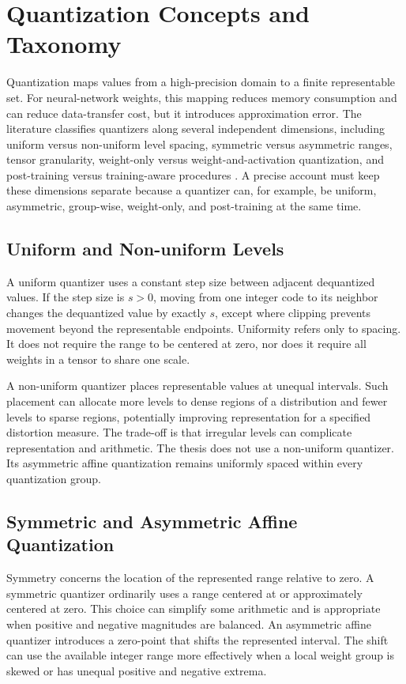 \section{Quantization Concepts and Taxonomy}

Quantization maps values from a high-precision domain to a finite representable set. For neural-network weights, this mapping reduces memory consumption and can reduce data-transfer cost, but it introduces approximation error. The literature classifies quantizers along several independent dimensions, including uniform versus non-uniform level spacing, symmetric versus asymmetric ranges, tensor granularity, weight-only versus weight-and-activation quantization, and post-training versus training-aware procedures \cite{gholami2021survey,nagel2021white}. A precise account must keep these dimensions separate because a quantizer can, for example, be uniform, asymmetric, group-wise, weight-only, and post-training at the same time.

\subsection{Uniform and Non-uniform Levels}

A uniform quantizer uses a constant step size between adjacent dequantized values. If the step size is $s>0$, moving from one integer code to its neighbor changes the dequantized value by exactly $s$, except where clipping prevents movement beyond the representable endpoints. Uniformity refers only to spacing. It does not require the range to be centered at zero, nor does it require all weights in a tensor to share one scale.

A non-uniform quantizer places representable values at unequal intervals. Such placement can allocate more levels to dense regions of a distribution and fewer levels to sparse regions, potentially improving representation for a specified distortion measure. The trade-off is that irregular levels can complicate representation and arithmetic. The thesis does not use a non-uniform quantizer. Its asymmetric affine quantization remains uniformly spaced within every quantization group.

\subsection{Symmetric and Asymmetric Affine Quantization}

Symmetry concerns the location of the represented range relative to zero. A symmetric quantizer ordinarily uses a range centered at or approximately centered at zero. This choice can simplify some arithmetic and is appropriate when positive and negative magnitudes are balanced. An asymmetric affine quantizer introduces a zero-point that shifts the represented interval. The shift can use the available integer range more effectively when a local weight group is skewed or has unequal positive and negative extrema.

